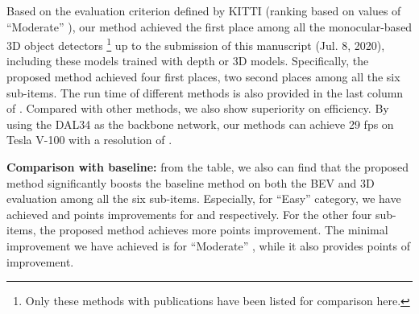 Based on the evaluation criterion defined by KITTI (ranking based on values of ``Moderate''  ), our method achieved the first place among all the monocular-based 3D object detectors \footnote{Only these methods with publications have been listed for comparison here.} up to the submission of this manuscript (Jul. 8, 2020), including these models trained with depth or 3D models. Specifically, the proposed method achieved four first places, two second places among all the six sub-items. The run time of different methods is also provided in the last column of . Compared with other methods, we also show superiority on efficiency. By using the DAL34 as the backbone network, our methods can achieve 29 fps on Tesla V-100 with a resolution of .  

\textbf{Comparison with baseline:} from the table, we also can find that the proposed method significantly boosts the baseline method on both the BEV and 3D evaluation among all the six sub-items. Especially, for ``Easy'' category, we have achieved  and  points improvements for  and  respectively. For the other four sub-items, the proposed method achieves more  points improvement. The minimal improvement we have achieved is for ``Moderate'' , while it also provides  points of improvement.

